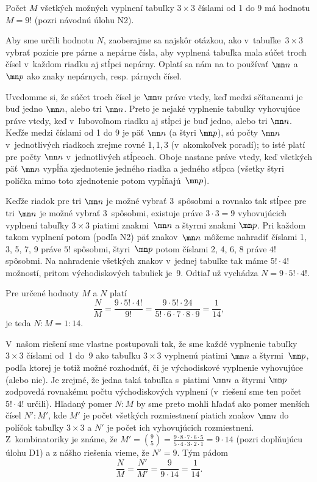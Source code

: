 {%
Počet $M$ všetkých možných vyplnení tabuľky $3\times 3$ číslami od 1 do 9
má hodnotu $M=9!$ (pozri návodnú úlohu N2).
\def\l{{\mn n}}
\def\s{{\mn p}}


Aby sme určili hodnotu $N$, zaoberajme sa najskôr otázkou,
ako v~tabuľke~$3\times3$ vybrať pozície
pre párne a nepárne čísla, aby vyplnená tabuľka mala súčet
troch čísel v~každom riadku aj stĺpci nepárny. Oplatí sa nám na to
používať $\l$ a $\s$ ako znaky nepárnych, resp. párnych čísel.

Uvedomme si, že súčet troch čísel je $\l$ práve vtedy, keď medzi sčítancami
je buď jedno $\l$, alebo tri $\l$. Preto je nejaké vyplnenie
tabuľky vyhovujúce práve vtedy, keď v~ľubovoľnom riadku aj stĺpci
je buď jedno, alebo tri $\l$. Keďže medzi číslami od 1 do 9 je päť $\l$
(a štyri $\s$), sú počty $\l$ v~jednotlivých riadkoch zrejme rovné
1,\,1,\,3 (v~akomkoľvek poradí); to isté platí pre počty $\l$ v~jednotlivých
stĺpcoch. Oboje nastane práve vtedy, keď všetkých päť $\l$ vypĺňa
zjednotenie jedného riadka a jedného stĺpca (všetky štyri políčka
mimo toto zjednotenie potom vypĺňajú~$\s$).

Keďže riadok pre tri $\l$ je možné vybrať 3~spôsobmi a rovnako tak
stĺpec pre tri $\l$ je možné vybrať 3~spôsobmi, existuje práve
$3\cdot3=9$ vyhovujúcich vyplnení tabuľky $3\times3$
piatimi znakmi~$\l$ a štyrmi znakmi $\s$. Pri každom takom vyplnení
potom (podľa N2) päť znakov~$\l$ môžeme nahradiť číslami 1, 3, 5, 7, 9 práve
$5!$ spôsobmi, štyri~$\s$ potom číslami 2, 4, 6, 8
práve $4!$ spôsobmi. Na nahradenie všetkých znakov v~jednej tabuľke
tak máme $5!\cdot4!$ možností, pritom východiskových tabuliek je~9.
Odtiaľ už vychádza $N=9\cdot5!\cdot4!$.

Pre určené hodnoty $M$ a $N$ platí
$$
\frac{N}{M}=\frac{9\cdot5!\cdot4!}{9!}=
\frac{9\cdot5!\cdot24}{5!\cdot6\cdot7\cdot8\cdot9}=\frac{1}{14},
$$
je teda $N:M=1:14$.

\poznamka
V~našom riešení sme vlastne postupovali tak, že sme každé vyplnenie
tabuľky $3\times3$ číslami od~1 do~9  ako tabuľku
$3\times3$ vyplnenú piatimi $\l$ a štyrmi~$\s$, podľa ktorej je totiž možné
rozhodnúť, či je východiskové vyplnenie vyhovujúce (alebo nie).
Je zrejmé, že jedna taká tabuľka s~piatimi $\l$ a štyrmi $\s$
zodpovedá rovnakému počtu východiskových vyplnení (v~riešení sme ten počet
$5!\cdot4!$ určili). Hľadaný pomer $N:M$ by sme preto mohli hľadať
ako pomer menších čísel $N':M'$, kde $M'$ je
počet všetkých rozmiestnení piatich znakov $\l$ do políčok tabuľky $3\times3$
a $N'$ je počet ich vyhovujúcich rozmiestnení. Z~kombinatoriky
je známe, že $M'=\binom{9}{5} =
\frac{9\cdot 8 \cdot 7 \cdot 6 \cdot 5}{5\cdot 4 \cdot 3 \cdot 2
\cdot 1} = 9 \cdot 14$ (pozri doplňujúcu úlohu D1)
a z nášho riešenia vieme, že $N'=9$. Tým pádom
$$
\frac{N}{M}=\frac{N'}{M'}=\frac{9}{9 \cdot 14}=\frac{1}{14}.
$$

}
